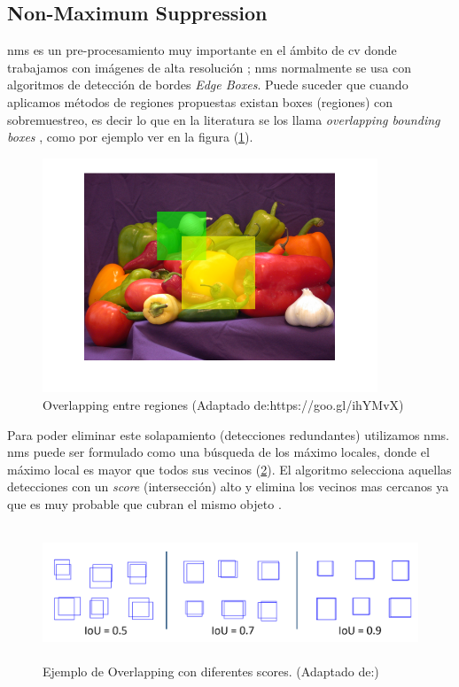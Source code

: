 \subsection{Non-Maximum Suppression}\label{sub:nonmaximumsuppression}

\ac{nms} es un pre-procesamiento muy importante en el ámbito de \ac{cv}  donde trabajamos con imágenes de alta resolución \citep{nms};  \ac{nms} normalmente se usa con algoritmos de detección de bordes \textit{Edge Boxes}. Puede  suceder que cuando aplicamos métodos de regiones propuestas existan boxes (regiones) con sobremuestreo, es decir lo que en la literatura se los llama \textit{overlapping bounding boxes} , como por ejemplo ver en la figura (\ref{Fig: overlapping}). 

\begin{figure}[H]
 \centering
  \includegraphics[height=7cm,keepaspectratio=true,clip=true]{imagenes/Logos/overlapMat.png}
  \caption{Overlapping entre regiones (Adaptado de:{https://goo.gl/ihYMvX})}
	\label{Fig: overlapping}
\end{figure}

Para poder eliminar este solapamiento (detecciones redundantes) utilizamos \ac{nms}. \ac{nms} puede ser formulado como una búsqueda de los máximo locales, donde el máximo local es  mayor que todos sus vecinos (\ref{Fig: interseccion}). El algoritmo selecciona aquellas detecciones con un \textit{score} (intersección) alto y elimina los vecinos mas cercanos ya que es muy probable que cubran el mismo objeto \citep{nms2}.

\begin{figure}[h]
 \centering
  \includegraphics[height=4cm,keepaspectratio=true,clip=true]{imagenes/Logos/overlapping.png}
  \caption{Ejemplo de Overlapping con diferentes scores. (Adaptado de:\citep{edges})}
	\label{Fig: interseccion}
\end{figure}

